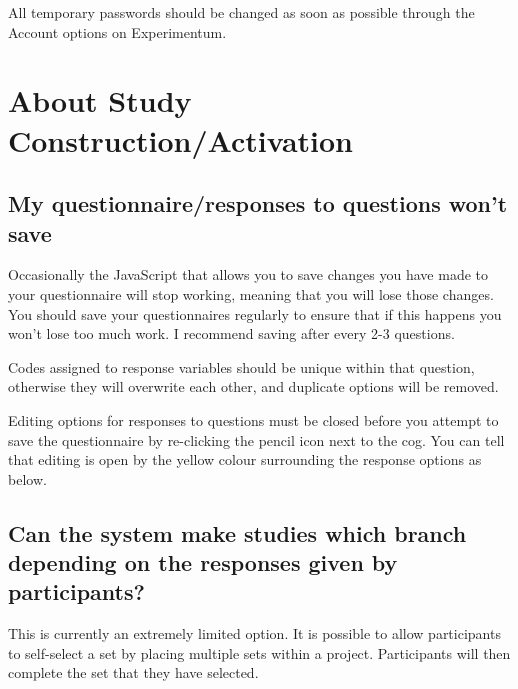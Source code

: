 \documentclass[]{book}
\begin{document}
All temporary passwords should be changed as soon as possible through the Account options on Experimentum.

\hypertarget{about-study-constructionactivation}{%
\section*{About Study Construction/Activation}\label{about-study-constructionactivation}}

\hypertarget{my-questionnaireresponses-to-questions-wont-save}{%
\subsection*{My questionnaire/responses to questions won't save}\label{my-questionnaireresponses-to-questions-wont-save}}

Occasionally the JavaScript that allows you to save changes you have made to your questionnaire will stop working, meaning that you will lose those changes. You should save your questionnaires regularly to ensure that if this happens you won't lose too much work. I recommend saving after every 2-3 questions.

Codes assigned to response variables should be unique within that question, otherwise they will overwrite each other, and duplicate options will be removed.

Editing options for responses to questions must be closed before you attempt to save the questionnaire by re-clicking the pencil icon next to the cog. You can tell that editing is open by the yellow colour surrounding the response options as below.

\hypertarget{can-the-system-make-studies-which-branch-depending-on-the-responses-given-by-participants}{%
\subsection*{Can the system make studies which branch depending on the responses given by participants?}\label{can-the-system-make-studies-which-branch-depending-on-the-responses-given-by-participants}}

This is currently an extremely limited option. It is possible to allow participants to self-select a set by placing multiple sets within a project. Participants will then complete the set that they have selected.
\end{document}
